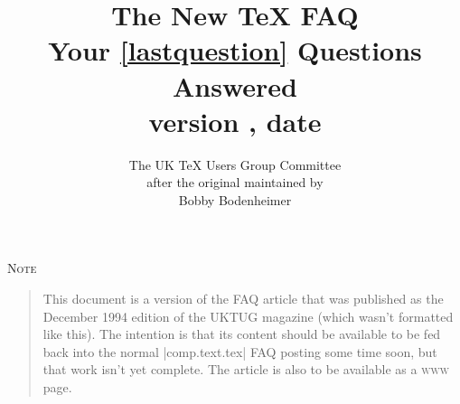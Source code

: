 \documentclass{faq}
\begin{document}
\title{The New \TeX{} FAQ\\
       Your \protect\ref{lastquestion} Questions Answered\\
       version \fileversion, date \filedate}
\author{The UK \TeX{} Users Group Committee\\
after the original maintained by \\
Bobby Bodenheimer} 
\maketitle

\centerline{\textsc{Note}}

\begin{quotation}\small
  This document is a version of the FAQ article that was published as
  the December 1994 edition of the UKTUG magazine \BV{} (which wasn't
  formatted like this).  The intention is that its content should be
  available to be fed back into the normal \Newsgroup|comp.text.tex|
  FAQ posting some time soon, but that work isn't yet complete.  The
  article is also to be available as a \textsc{www} page.
\end{quotation}

\begin{multicols}{2}
\tableofcontents
\end{multicols}

\ifnotreadCTAN
  
  
  \notreadCTANfalse
\fi

\Dings

\begin{multicols}{2}

\end{multicols}

\end{document}
